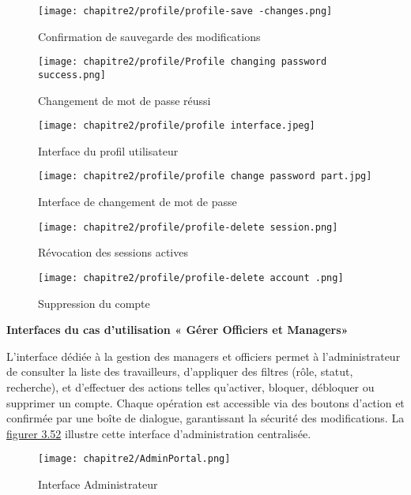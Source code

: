 \begin{figure}[H]
  \centering
  \begin{minipage}[t]{\textwidth}
    \centering
    \texttt{[image: chapitre2/profile/profile-save -changes.png]}
    \caption{Confirmation de sauvegarde des modifications}
    \label{fig:3.46}
    \vspace{0.3cm}
    \texttt{[image: chapitre2/profile/Profile changing password success.png]}
    \caption{Changement de mot de passe réussi}
    \label{fig:3.47}
  \end{minipage}

\end{figure}
\begin{figure}[H]
  \centering

  \begin{minipage}[t]{\textwidth}
    \centering
    \texttt{[image: chapitre2/profile/profile interface.jpeg]}
    \caption{Interface du profil utilisateur}
    \label{fig:3.48}
  \end{minipage}
\end{figure}
\begin{figure}[H]
  \centering
  \begin{minipage}[t]{\textwidth}
    \centering
    \texttt{[image: chapitre2/profile/profile change password part.jpg]}
    \caption{Interface de changement de mot de passe}
    \label{fig:3.49}

    \vspace{0.3cm}

    \texttt{[image: chapitre2/profile/profile-delete session.png]}
    \caption{Révocation des sessions actives}
    \label{fig:3.50}
    \vspace{0.3cm}

    \texttt{[image: chapitre2/profile/profile-delete account .png]}
    \caption{Suppression du compte}
    \label{fig:3.51}
  \end{minipage}

\end{figure}
\textbf{Interfaces du cas d'utilisation « Gérer Officiers et Managers»}

L’interface dédiée à la gestion des managers et officiers permet à l’administrateur de consulter la liste des travailleurs, d’appliquer des filtres (rôle, statut, recherche), et d’effectuer des actions telles qu’activer, bloquer, débloquer ou supprimer un compte. Chaque opération est accessible via des boutons d’action et confirmée par une boîte de dialogue, garantissant la sécurité des modifications. La \hyperref[fig:3.52]{figurer 3.52} illustre cette interface d’administration centralisée.
\begin{figure}[H]
\centering
\texttt{[image: chapitre2/AdminPortal.png]}
    \caption{Interface Administrateur}
    \label{fig:3.51}

\end{figure}


